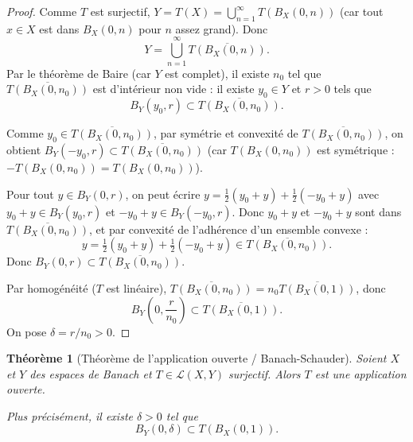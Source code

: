 \documentclass[a4paper,12pt]{book}
\theoremstyle{definition}
\theoremstyle{plain}
\newtheorem{theoreme}[definition]{Théorème}
\theoremstyle{remark}
\begin{document}
\begin{proof}
Comme $T$ est surjectif, $Y = T(X) = \bigcup_{n=1}^{\infty} T(B_X(0,n))$
(car tout $x \in X$ est dans $B_X(0,n)$ pour $n$ assez grand). Donc
\[
  Y = \bigcup_{n=1}^{\infty} \overline{T(B_X(0,n))}.
\]
Par le théorème de Baire (car $Y$ est complet),
il existe $n_0$ tel que $\overline{T(B_X(0,n_0))}$ est d'intérieur non vide :
il existe $y_0 \in Y$ et $r > 0$ tels que
\[
  B_Y(y_0, r) \subset \overline{T(B_X(0,n_0))}.
\]

Comme $y_0 \in \overline{T(B_X(0,n_0))}$, par symétrie et convexité de
$\overline{T(B_X(0,n_0))}$, on obtient
$B_Y(-y_0, r) \subset \overline{T(B_X(0,n_0))}$
(car $T(B_X(0,n_0))$ est symétrique : $-T(B_X(0,n_0)) = T(B_X(0,n_0))$).

Pour tout $y \in B_Y(0,r)$, on peut écrire $y = \frac{1}{2}(y_0+y) + \frac{1}{2}(-y_0+y)$
avec $y_0+y \in B_Y(y_0,r)$ et $-y_0+y \in B_Y(-y_0,r)$.
Donc $y_0 + y$ et $-y_0 + y$ sont dans $\overline{T(B_X(0,n_0))}$, et par convexité
de l'adhérence d'un ensemble convexe :
\[
  y = \tfrac{1}{2}(y_0+y) + \tfrac{1}{2}(-y_0+y) \in \overline{T(B_X(0,n_0))}.
\]
Donc $B_Y(0,r) \subset \overline{T(B_X(0,n_0))}$.

Par homogénéité ($T$ est linéaire), $\overline{T(B_X(0,n_0))} = n_0 \overline{T(B_X(0,1))}$,
donc
\[
  B_Y\!\left(0, \frac{r}{n_0}\right) \subset \overline{T(B_X(0,1))}.
\]
On pose $\delta = r/n_0 > 0$.
\end{proof}

\begin{theoreme}[Théorème de l'application ouverte / Banach-Schauder]
\label{thm:application-ouverte}
Soient $X$ et $Y$ des espaces de Banach et $T \in \mathcal{L}(X,Y)$
surjectif. Alors $T$ est une application ouverte.

Plus précisément, il existe $\delta > 0$ tel que
\[
  B_Y(0, \delta) \subset T(B_X(0,1)).
\]
\end{theoreme}
\end{document}
